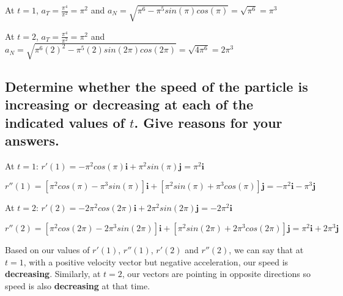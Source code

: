 \documentclass{article}
\begin{document}
\par\noindent At $t = 1$, $a_{T} = \frac{\pi^{4}}{\pi^{2}} = \pi^{2}$ and $a_{N} = \sqrt{\pi^{6} - \pi^{5}sin(\pi)cos(\pi)} = \sqrt{\pi^{6}} = \pi^{3}$\vspace{0.10cm}
\par\noindent At $t = 2$, $a_{T} = \frac{\pi^{4}}{\pi^{2}} = \pi^{2}$ and $a_{N} = \sqrt{\pi^{6}(2)^{2} - \pi^{5}(2)sin(2\pi)cos(2\pi)} = \sqrt{4\pi^{6}} = 2\pi^{3}$

\subsection{Determine whether the speed of the particle is increasing or decreasing at each of the indicated values of $t$.  Give reasons for your answers.}

\par\noindent\large At $t = 1$: $r'(1) = -\pi^{2}cos(\pi)\textbf{i} + \pi^{2}sin(\pi)\textbf{j} = \pi^{2}\textbf{i}$%
\par\noindent\large $r''(1) = [\pi^{2}cos(\pi) - \pi^{3}sin(\pi)]\textbf{i} + [\pi^{2}sin(\pi) + \pi^{3}cos(\pi)]\textbf{j} = -\pi^{2}\textbf{i} - \pi^{3}\textbf{j}$\vspace{0.25cm}

\par\noindent At $t = 2$: $r'(2) = -2\pi^{2}cos(2\pi)\textbf{i} + 2\pi^{2}sin(2\pi)\textbf{j} = -2\pi^{2}\textbf{i}$ %
\par\noindent $r''(2) = [\pi^{2}cos(2\pi) - 2\pi^{3}sin(2\pi)]\textbf{i} + [\pi^{2}sin(2\pi) + 2\pi^{3}cos(2\pi)]\textbf{j} = \pi^{2}\textbf{i} + 2\pi^{3}\textbf{j}$\vspace{0.25cm}

\par\noindent Based on our values of $r'(1)$, $r''(1)$, $r'(2)$ and $r''(2)$, we can say that at $t = 1$, with a positive velocity vector but negative acceleration, our speed is \textbf{decreasing}.  Similarly, at $t = 2$, our vectors are pointing in opposite directions so speed is also \textbf{decreasing} at that time.
\end{document}
